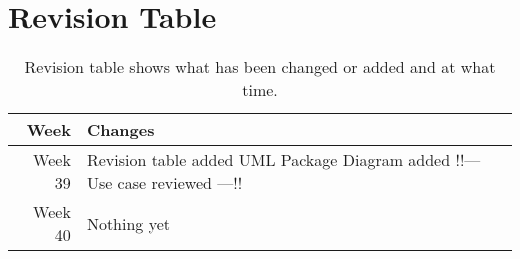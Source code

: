 \section{Revision Table}
\begin{table*}[ht]\centering
  \begin{tabularx}{\textwidth}{@{}rX@{}}
    \toprule
    \textbf{Week} & \textbf{Changes} \\\hline
    Week 39 & Revision table added\newline  
    		UML Package Diagram added \newline
    		!!--- Use case reviewed ---!!\\\hline
    Week 40 & Nothing yet\\
    \bottomrule
  \end{tabularx}
  \caption{Revision table shows what has been changed or added and at what time.}
  \label{glossary}\centering
\end{table*}
\newpage